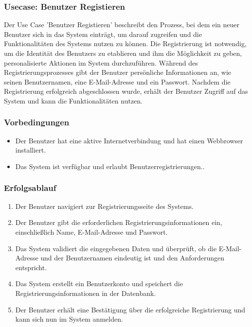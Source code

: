 \subsubsection{Usecase: Benutzer Registieren}

Der Use Case 'Benutzer Registieren' beschreibt den Prozess, bei dem ein neuer Benutzer sich in das System einträgt, 
um darauf zugreifen und die Funktionalitäten des Systems nutzen zu können. Die Registrierung ist 
notwendig, um die Identität des Benutzers zu etablieren und ihm die Möglichkeit zu geben, 
personalisierte Aktionen im System durchzuführen. Während des Registrierungsprozesses gibt der 
Benutzer persönliche Informationen an, wie seinen Benutzernamen, eine E-Mail-Adresse und ein 
Passwort. Nachdem die Registrierung erfolgreich abgeschlossen wurde, erhält der Benutzer 
Zugriff auf das System und kann die Funktionalitäten nutzen.

\subsubsection*{Vorbedingungen}

\begin{itemize}
  \item Der Benutzer hat eine aktive Internetverbindung und hat einen Webbrowser installiert.
  \item Das System ist verfügbar und erlaubt Benutzerregistrierungen..
\end{itemize}

\subsubsection*{Erfolgsablauf}

\begin{enumerate}
  \item Der Benutzer navigiert zur Registrierungsseite des Systems.
  \item Der Benutzer gibt die erforderlichen Registrierungsinformationen ein, einschließlich Name, E-Mail-Adresse und Passwort.
  \item Das System validiert die eingegebenen Daten und überprüft, ob die E-Mail-Adresse und der Benutzernamen eindeutig ist und den Anforderungen entspricht.
  \item Das System erstellt ein Benutzerkonto und speichert die Registrierungsinformationen in der Datenbank.
  \item Der Benutzer erhält eine Bestätigung über die erfolgreiche Registrierung und kann sich nun im System anmelden.
\end{enumerate}

